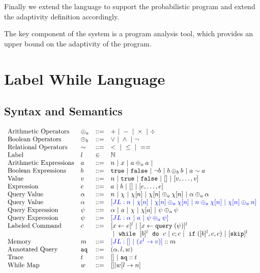 \documentclass[a4paper,11pt]{article}
\begin{document}
Finally we extend the language to support the probabilistic program and extend the adaptivity definition accordingly.


The key component of the system is a program analysis tool, which provides an upper bound on the adaptivity of the program.

\section{Label While Language}
\label{sec:while_language}
%
\subsection{Syntax and Semantics}
%
\[
\begin{array}{llll}
 \mbox{Arithmetic Operators} & \oplus_a & ::= & + ~|~ - ~|~ \times 
%
~|~ \div \\  
  \mbox{Boolean Operators} & \oplus_b & ::= & \lor ~|~ \land ~|~ \neg\\
   \mbox{Relational Operators} & \sim & ::= & < ~|~ \leq ~|~ == \\  
   \mbox{Label} & l & \in &  \mathbb{N}  \\  
\mbox{Arithmetic Expressions} & \aexpr & ::= & 
	n ~|~ x ~|~ \aexpr \oplus_a \aexpr ~|~ \\
\mbox{Boolean Expressions} & \bexpr & ::= & 
	\etrue ~|~ \efalse  ~|~ \neg \bexpr
	 ~|~ \bexpr \oplus_b \bexpr
	~|~ \aexpr \sim \aexpr \\
%
\mbox{Value} 
& v & ::= & { n \sep \etrue \sep \efalse ~|~ [] ~|~ [v, \dots, v]}  
\\
%
\mbox{Expression} 
& \expr & ::= & {\aexpr \sep \bexpr ~|~ [] ~|~ [\expr, \dots, \expr]} 
\\
%
\mbox{Query Value} & \qval & ::= 
& { n ~|~ \chi ~|~ \chi[n] ~|~ \chi[n] \oplus_a  \chi[n] ~|~ \qval \oplus_a  \qval }
\\
%
\mbox{Query Value} & \qval & ::= 
& \jl{n ~|~ \chi[n] ~|~ \chi[n] \oplus_a  \chi[n] ~|~ n \oplus_a  \chi[n]
~|~ \chi[n] \oplus_a  n}
\\
%
\mbox{Query Expression} 
& \qexpr & ::= 
& { \qval ~|~ \aexpr ~|~ \chi ~|~ \chi[\aexpr] ~|~ \qexpr \oplus_a \qexpr} 
\\
%
\mbox{Query Expression} 
& \qexpr & ::= 
& \jl{ \qval ~|~ \aexpr ~|~ \qexpr \oplus_a \qexpr} 
\\
\mbox{{Labeled Command}} & c & ::= 
	&   [\assign x \expr]^{l} ~|~  [\assign x \query(\qexpr)]^{l}
	\\
 	& & & ~|~  \ewhile ~ [b]^l ~ \edo ~ c  ~|~ c;c  ~|~ \eif([\bexpr]^l, c, c) 	 ~|~ [\eskip]^{l} 
 \\
\mbox{Memory} 
& m & ::= & \jl{[] ~|~ (x^{l} \to v)} :: m 
\\
%
\mbox{Annotated Query} & \aq  & 
::= & (\qval, l, w)
\\
%
\mbox{Trace} 
& t & ::= & [] ~|~ {\aq :: t}
\\
%
\mbox{While Map}
& w & ::= & {[] |  w[l \to n]}
\end{array}
\]
\end{document}
